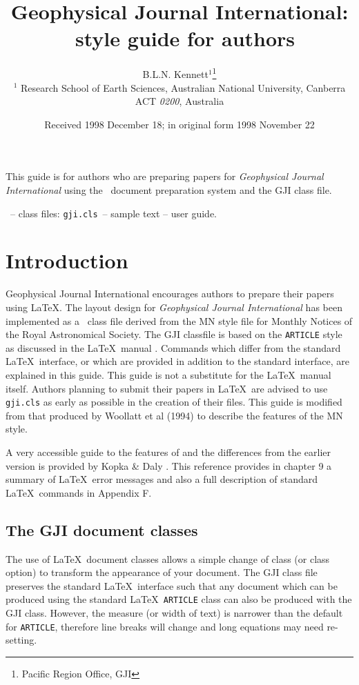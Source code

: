 \documentclass{gji}
\title[Geophys.\ J.\ Int.: \LaTeXe\ Guide for Authors]
  {Geophysical Journal International:
   \LaTeXe\ style guide for authors}
\author[B.L.N. Kennett]
  {B.L.N. Kennett$^1$\thanks{Pacific Region Office, GJI} \\
  $^1$ Research School of Earth Sciences, Australian National
    University, Canberra ACT \emph{0200}, Australia
  }
\date{Received 1998 December 18; in original form 1998 November 22}
\begin{document}
\label{firstpage}

\maketitle


\begin{summary}
 This guide is for authors who are preparing papers for
 \textit{Geophysical Journal International} using the
\LaTeXe\ document preparation system and the GJI class file.
\end{summary}

\begin{keywords}
 \LaTeXe\ -- class files: \verb"gji.cls"\ -- sample text -- user guide.
\end{keywords}

\section{Introduction}

Geophysical Journal International encourages authors to prepare their papers using \LaTeX.
The layout design for \textit{Geophysical Journal International} has been
implemented as a \LaTeXe\ class file derived from the MN style file for
Monthly Notices of the Royal Astronomical Society. The GJI classfile is
based on the \verb"ARTICLE" style as discussed in the \LaTeX\ manual
\cite {la}. Commands which differ from the standard \LaTeX\ interface, or
which are provided in addition to the standard interface, are explained
in this guide. This guide is not a substitute for the \LaTeX\ manual
itself. Authors planning to submit their papers in \LaTeX\ are advised to
use \verb"gji.cls" as  early as possible in the creation of their
files.  This guide is modified from that produced by Woollatt et al (1994)
to describe the features of the MN style.

A very accessible guide to the features of \LaTeXe and the differences
from the earlier version is provided by Kopka \& Daly .  This
reference provides in chapter 9 a summary of \LaTeX\ error messages and also
a full description of standard \LaTeX\ commands in Appendix F.


\subsection{The GJI document classes}

The use of \LaTeX\ document classes allows a simple change of class
(or class option) to transform the appearance of your document. The
GJI class file preserves the standard \LaTeX\ interface such that any
document which can be produced using the standard \LaTeX\ \verb"ARTICLE"
class can also be produced with the GJI class. However, the measure (or
width of text) is narrower than the default for \verb"ARTICLE", therefore
line breaks will change and long equations may need re-setting.
\end{document}
